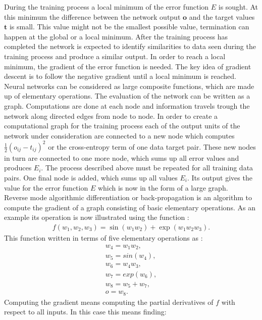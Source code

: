During the training process a local minimum of the error function $E$ is sought. At this minimum the difference between the network output $\mathbf{o}$ and the target values $\mathbf{t}$ is small. This value might not be the smallest possible value, termination can happen at the global or a local minimum.
After the training process has completed the network is expected to identify similarities to data seen during the training process and produce a similar output.
In order to reach a local minimum, the gradient of the error function is needed. The key idea of gradient descent is to follow the negative gradient until a local minimum is reached.
Neural networks can be considered as large composite functions, which are made up of elementary operations. The evaluation of the network can be written as a graph. Computations are done at each node and information travels trough the network along directed edges from node to node. In order to create a computational graph for the training process each of the output units of the network under consideration are connected to a new node which computes $\frac{1}{2}(o_{ij} - t_{ij})^2$\cite[page 157]{Rojas1996} or the cross-entropy term of one data target pair. These new nodes in turn are connected to one more node, which sums up all error values and produces $E_i$. The process described above must be repeated for all training data pairs. One final node is added, which sums up all values $E_i$. Its output gives the value for the error function $E$ which is now in the form of a large graph.\\
Reverse mode algorithmic differentiation or back-propagation is an algorithm to compute the gradient of a graph consisting of basic elementary operations. As an example its operation is now illustrated using the function \cite[page 69]{Diehl2013}:
\begin{align}
f(w_1,w_2,w_3) = \sin(w_1 w_2) + \exp(w_1 w_2 w_3).
\label{eq:backFun}
\end{align}
This function written in terms of five elementary operations as \cite[page 70]{Diehl2013}:
\begin{align}
w_4 = w_1 w_2, \\
w_5 = sin(w_4),\\
w_6 = w_4 w_3, \\
w_7 = exp(w_6), \\
w_8 = w_5 + w_7, \\
o = w_8.
\end{align}
Computing the gradient means computing the partial derivatives of $f$ with respect to all inputs. In this case this means finding:
